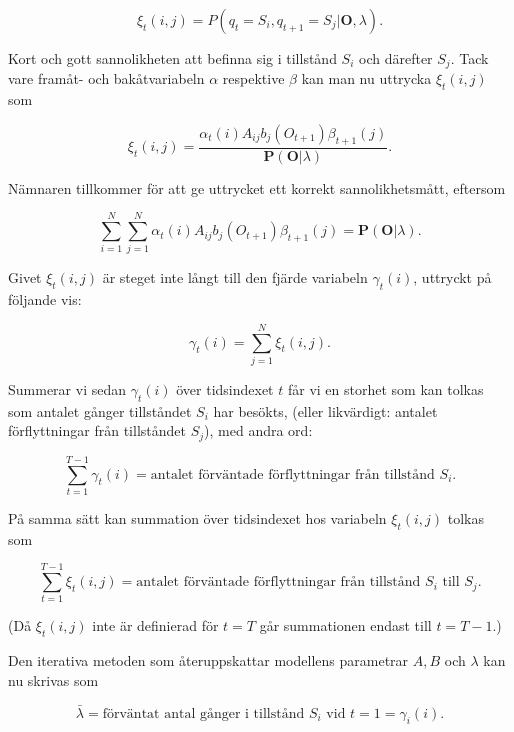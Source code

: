 \documentclass[../rapport_MVEX01-11-05]{subfiles}
\begin{document}
\begin{equation*}
\xi_t(i,j) = P(q_t = S_i, q_{t+1} = S_j|\textbf{O},\lambda).
\end{equation*}

Kort och gott sannolikheten att befinna sig i tillstånd $S_i$ och
därefter $S_j$. Tack vare framåt- och bakåtvariabeln $\alpha$
respektive $\beta$ kan man nu uttrycka $\xi_t(i,j)$ som

\begin{equation*}
\xi_t(i,j) = \frac{\alpha_t(i)A_{ij}b_j(O_{t+1})\beta_{t+1}(j)}{\textbf{P}(\textbf{O}|\lambda)}.
\end{equation*} 

Nämnaren tillkommer för att ge uttrycket ett korrekt sannolikhetsmått, eftersom 

\begin{equation*}
\sum_{i=1}^N\sum_{j=1}^N\alpha_t(i)A_{ij}b_j(O_{t+1})\beta_{t+1}(j) = \textbf{P}(\textbf{O}|\lambda).
\end{equation*}

Givet $\xi_t(i,j)$ är steget inte långt till den fjärde variabeln
$\gamma_t(i)$, uttryckt på följande vis:

\begin{equation*}
\gamma_t(i) = \sum_{j=1}^N\xi_t(i,j).
\end{equation*}

Summerar vi sedan $\gamma_t(i)$ över tidsindexet $t$ får vi en storhet
som kan tolkas som antalet gånger tillståndet $S_i$ har besökts,
(eller likvärdigt: antalet förflyttningar från tillståndet $S_j$), med
andra ord:

\begin{equation*}
\sum_{t=1}^{T-1}\gamma_t(i) = \text{antalet förväntade förflyttningar
  från tillstånd $S_i$.}
\end{equation*} 

På samma sätt kan summation över tidsindexet hos variabeln
$\xi_t(i,j)$ tolkas som 

\begin{equation*}
\sum_{t=1}^{T-1}\xi_t(i,j) = \text{antalet förväntade förflyttningar
  från tillstånd $S_i$ till $S_j$.}
\end{equation*}

(Då $\xi_t(i,j)$ inte är definierad för $t=T$ går summationen endast
till $t = T -1$.)

Den iterativa metoden som återuppskattar modellens parametrar $A,B$
och $\lambda$ kan nu skrivas som

\begin{equation*}
\bar{\lambda} = \text{förväntat antal gånger i tillstånd $S_i$ vid
  $t=1$} = \gamma_i(i).
\end{equation*}
\end{document}
